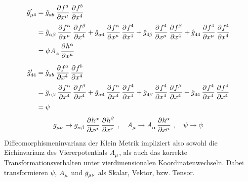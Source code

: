 \begin{equation}
\begin{split}
\tensor*{\hat{g}}{*^\prime_\mu_4}&=\tensor{\hat{g}}{_a_b}\dpd{f^a}{\tensor{x}{^\mu}}\dpd{f^b}{\tensor{x}{^4}}\\
&=\tensor{\hat{g}}{_\alpha_\beta}\dpd{f^\alpha}{\tensor{x}{^\mu}}\dpd{f^\beta}{\tensor{x}{^4}}
+\tensor{\hat{g}}{_\alpha_4}\dpd{f^\alpha}{\tensor{x}{^\mu}}\dpd{f^4}{\tensor{x}{^4}}
+\tensor{\hat{g}}{_4_\beta}\dpd{f^4}{\tensor{x}{^\mu}}\dpd{f^\beta}{\tensor{x}{^4}}
+\tensor{\hat{g}}{_4_4}\dpd{f^4}{\tensor{x}{^\mu}}\dpd{f^4}{\tensor{x}{^4}}\\
&=\psi\tensor{A}{_\alpha}\dpd{h^\alpha}{\tensor{x}{^\mu}}
\end{split}
\end{equation}
\begin{equation}
\begin{split}
\tensor*{\hat{g}}{*^\prime_4_4}&=\tensor{\hat{g}}{_a_b}\dpd{f^a}{\tensor{x}{^4}}\dpd{f^b}{\tensor{x}{^4}}\\
&=\tensor{\hat{g}}{_\alpha_\beta}\dpd{f^\alpha}{\tensor{x}{^4}}\dpd{f^\beta}{\tensor{x}{^4}}
+\tensor{\hat{g}}{_\alpha_4}\dpd{f^\alpha}{\tensor{x}{^4}}\dpd{f^4}{\tensor{x}{^4}}
+\tensor{\hat{g}}{_4_\beta}\dpd{f^4}{\tensor{x}{^4}}\dpd{f^\beta}{\tensor{x}{^4}}
+\tensor{\hat{g}}{_4_4}\dpd{f^4}{\tensor{x}{^4}}\dpd{f^4}{\tensor{x}{^4}}\\
&=\psi
\end{split}
\end{equation}
\begin{equation}
\tensor{g}{_\mu_\nu}\to\tensor{g}{_\alpha_\beta}\dpd{h^\alpha}{\tensor{x}{^\mu}}\dpd{h^\beta}{\tensor{x}{^\nu}}\,,\quad
\tensor{A}{_\mu}\to\tensor{A}{_\alpha}\dpd{h^\alpha}{\tensor{x}{^\mu}}\,,\quad
\psi\to\psi
\end{equation}
Diffeomorphismeninvarianz der Klein Metrik impliziert also sowohl die
Eichinvarianz des Viererpotentials $\tensor{A}{_\mu}$, als auch das korrekte
Transformationsverhalten unter vierdimensionalen Koordinatenwechseln.
Dabei transformieren $\psi$, $\tensor{A}{_\mu}$ und $\tensor{g}{_\mu_\nu}$ als
Skalar, Vektor, bzw. Tensor.


